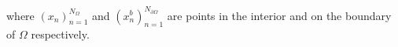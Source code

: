 where $(x_n)_{n=1}^{N_\Omega}$ and  $(x^b_n)_{n=1}^{N_{\partial\Omega}}$ are points in the interior and on the boundary of $\Omega$ respectively.


